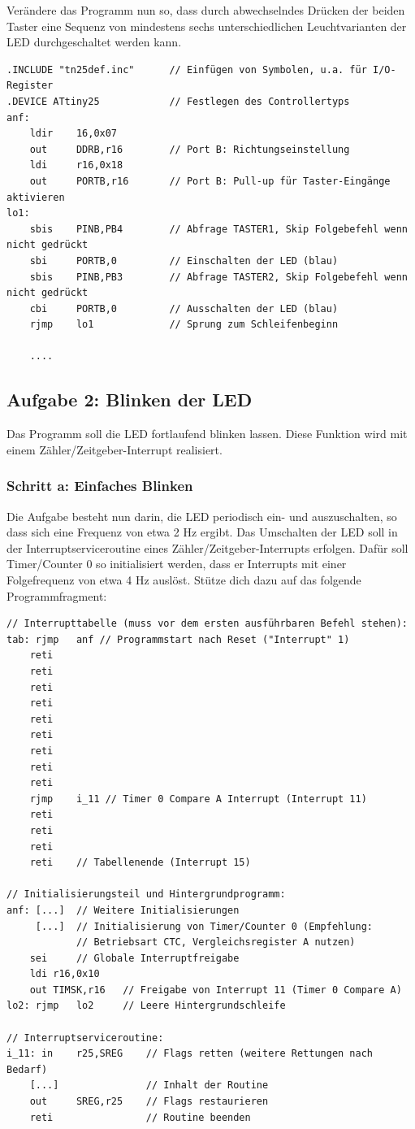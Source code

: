 \documentclass[a4paper,12pt,titlepage]{scrartcl}
\begin{document}
Verändere das Programm nun so, dass durch abwechselndes Drücken der beiden Taster eine Sequenz von mindestens sechs unterschiedlichen Leuchtvarianten der LED durchgeschaltet werden kann.
\begin{lstlisting}[basicstyle=\tiny]
.INCLUDE "tn25def.inc"      // Einfügen von Symbolen, u.a. für I/O-Register
.DEVICE ATtiny25            // Festlegen des Controllertyps
anf:
    ldir    16,0x07
    out     DDRB,r16        // Port B: Richtungseinstellung
    ldi     r16,0x18
    out     PORTB,r16       // Port B: Pull-up für Taster-Eingänge aktivieren
lo1:
    sbis    PINB,PB4        // Abfrage TASTER1, Skip Folgebefehl wenn nicht gedrückt
    sbi     PORTB,0         // Einschalten der LED (blau)
    sbis    PINB,PB3        // Abfrage TASTER2, Skip Folgebefehl wenn nicht gedrückt
    cbi     PORTB,0         // Ausschalten der LED (blau)
    rjmp    lo1             // Sprung zum Schleifenbeginn

    ....
\end{lstlisting}

\subsection*{Aufgabe 2: Blinken der LED}
Das Programm soll die LED fortlaufend blinken lassen. Diese Funktion wird mit einem Zähler/Zeitgeber-Interrupt realisiert.

\subsubsection*{Schritt a: Einfaches Blinken}
Die Aufgabe besteht nun darin, die LED periodisch ein- und auszuschalten, so dass sich eine Frequenz von etwa 2 Hz ergibt. Das Umschalten der LED soll in der Interruptserviceroutine eines Zähler/Zeitgeber-Interrupts erfolgen. Dafür soll Timer/Counter 0 so initialisiert werden, dass er Interrupts mit einer Folgefrequenz von etwa 4 Hz auslöst. Stütze dich dazu auf das folgende Programmfragment:
\begin{lstlisting}[basicstyle=\tiny]
// Interrupttabelle (muss vor dem ersten ausführbaren Befehl stehen):
tab: rjmp   anf // Programmstart nach Reset ("Interrupt" 1)
    reti
    reti
    reti
    reti
    reti
    reti
    reti
    reti
    reti
    rjmp    i_11 // Timer 0 Compare A Interrupt (Interrupt 11)
    reti
    reti
    reti
    reti    // Tabellenende (Interrupt 15)

// Initialisierungsteil und Hintergrundprogramm:
anf: [...]  // Weitere Initialisierungen
     [...]  // Initialisierung von Timer/Counter 0 (Empfehlung:
            // Betriebsart CTC, Vergleichsregister A nutzen)
    sei     // Globale Interruptfreigabe
    ldi r16,0x10
    out TIMSK,r16   // Freigabe von Interrupt 11 (Timer 0 Compare A)
lo2: rjmp   lo2     // Leere Hintergrundschleife

// Interruptserviceroutine:
i_11: in    r25,SREG    // Flags retten (weitere Rettungen nach Bedarf)
    [...]               // Inhalt der Routine
    out     SREG,r25    // Flags restaurieren
    reti                // Routine beenden
\end{lstlisting}
\end{document}
